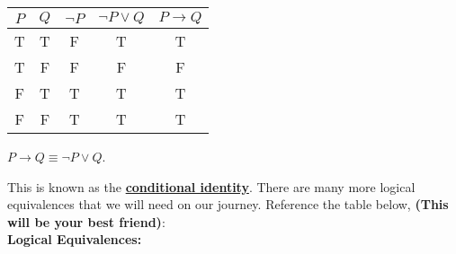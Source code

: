 \begin{center}
    \begin{tabular}{|c|c|c|c|c|}
        \hline
        \rowcolor{OliveGreen!10}
        $P$ & $Q$ & $\neg P$ & $\neg P \lor Q$ & $P \rightarrow Q$ \\
        \hline
        T   & T   & F        & T               & T                 \\
        T   & F   & F        & F               & F                 \\
        F   & T   & T        & T               & T                 \\
        F   & F   & T        & T               & T                 \\
        \hline
    \end{tabular}
\end{center}

{\centering $P \rightarrow Q\equiv\neg P \lor Q$.\\}

\newpage

\noindent
This is known as the \underline{\textbf{conditional identity}}. There are many more logical equivalences
that we will need on our journey. Reference the table below, \textbf{(This will be your best friend)}:\\

\vspace{1em}
\noindent
{\Large \textbf{Logical Equivalences:}\\}

